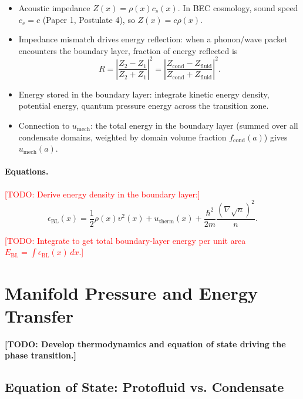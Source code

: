 \documentclass[11pt,a4paper]{article}
\newcommand{\umech}{\ensuremath{u_{\mathrm{mech}}}}
\newcommand{\Zfluid}{\ensuremath{Z_{\mathrm{fluid}}}}
\newcommand{\Zcond}{\ensuremath{Z_{\mathrm{cond}}}}
\theoremstyle{definition}
\theoremstyle{remark}
\begin{document}
\begin{itemize}[leftmargin=*, itemsep=0.3em]
\item Acoustic impedance $Z(x) = \rho(x) c_s(x)$. In BEC cosmology, sound speed $c_s = c$ (Paper 1, Postulate 4), so $Z(x) = c \rho(x)$.
\item Impedance mismatch drives energy reflection: when a phonon/wave packet encounters the boundary layer, fraction of energy reflected is
\begin{equation}
R = \left| \frac{Z_2 - Z_1}{Z_2 + Z_1} \right|^2 = \left| \frac{\Zcond - \Zfluid}{\Zcond + \Zfluid} \right|^2.
\label{eq:reflection_coeff}
\end{equation}
\item Energy stored in the boundary layer: integrate kinetic energy density, potential energy, quantum pressure energy across the transition zone.
\item Connection to $\umech$: the total energy in the boundary layer (summed over all condensate domains, weighted by domain volume fraction $f_{\mathrm{cond}}(a)$) gives $\umech(a)$.
\end{itemize}

\paragraph{Equations.}
\textcolor{red}{[TODO: Derive energy density in the boundary layer:]}
\begin{equation}
\epsilon_{\mathrm{BL}}(x) = \frac{1}{2}\rho(x) v^2(x) + u_{\mathrm{therm}}(x) + \frac{\hbar^2}{2m}\frac{(\nabla\sqrt{n})^2}{n}.
\label{eq:energy_density_bl}
\end{equation}

\textcolor{red}{[TODO: Integrate to get total boundary-layer energy per unit area $E_{\mathrm{BL}} = \int \epsilon_{\mathrm{BL}}(x) \, dx$.]}

\section{Manifold Pressure and Energy Transfer}
\label{sec:manifold_pressure}

\textbf{[TODO: Develop thermodynamics and equation of state driving the phase transition.]}

\subsection{Equation of State: Protofluid vs. Condensate}
\label{sec:eos}
\end{document}
